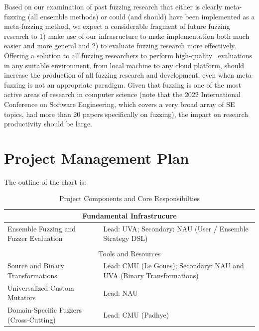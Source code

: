 Based on our examination of past fuzzing research that either is
clearly meta-fuzzing (all ensemble methods) or could (and should)
have been implemented as a meta-fuzzing method, we expect a
considerable fragment of future fuzzing research to 1) make
use of our infrasructure to make implementation both much easier and
more general and 2) to evaluate fuzzing research more effectively.
Offering a solution to all fuzzing researchers to perform
high-quality~\cite{HicksFuzzing} evaluations in any suitable
environment, from local machine to any cloud platform, should increase
the production of all fuzzing research and development, even when
meta-fuzzing is not an appropriate paradigm.  Given that fuzzing is
one of the most active areas of research in computer science (note
that the 2022 International Conference on Software Engineering, which
covers a very broad array of SE topics, had more than 20 papers
specifically on fuzzing), the impact on research productivity should
be large.

\section{Project Management Plan}

%
\label{sec:plan}


The outline of the chart is:

\begin{table}
 \begin{tabularx}{\textwidth}{|p{7.5cm}|X|}
   \hline
   \multicolumn{2}{|c|}{Fundamental Infrastrucure} \\
   \hline
    Ensemble Fuzzing and
    Fuzzer Evaluation & Lead: UVA; Secondary: NAU (User / Ensemble
    Strategy DSL)\\
   \hline
   \multicolumn{2}{c}{} \\
   \hline
   \multicolumn{2}{|c|}{Tools and Resources} \\
   \hline
    Source and Binary Transformations & Lead: CMU (Le
    Goues); Secondary: NAU and UVA (Binary Transformations)\\
    Universalized Custom Mutators & Lead: NAU\\
     Domain-Specific Fuzzers (Cross-Cutting) & Lead: CMU (Padhye) \\
   \hline
  \end{tabularx}
  \caption{\label {tab:thrusts} Project Components and Core Responsibilties}
\end{table}

